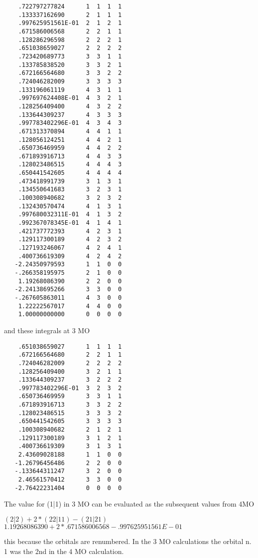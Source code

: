 \documentclass[a4paper,11pt]{report}
\begin{document}
\begin{verbatim}
    .722797277824      1  1  1  1
    .133337162690      2  1  1  1
    .997625951561E-01  2  1  2  1
    .671586006568      2  2  1  1
    .128286296598      2  2  2  1
    .651038659027      2  2  2  2
    .723420689773      3  3  1  1
    .133785838520      3  3  2  1
    .672166564680      3  3  2  2
    .724046282009      3  3  3  3
    .133196061119      4  3  1  1
    .997697624408E-01  4  3  2  1
    .128256409400      4  3  2  2
    .133644309237      4  3  3  3
    .997783402296E-01  4  3  4  3
    .671313370894      4  4  1  1
    .128056124251      4  4  2  1
    .650736469959      4  4  2  2
    .671893916713      4  4  3  3
    .128023486515      4  4  4  3
    .650441542605      4  4  4  4
    .473418991739      3  1  3  1
    .134550641683      3  2  3  1
    .100308940682      3  2  3  2
    .132430570474      4  1  3  1
    .997680032311E-01  4  1  3  2
    .992367078345E-01  4  1  4  1
    .421737772393      4  2  3  1
    .129117300189      4  2  3  2
    .127193246067      4  2  4  1
    .400736619309      4  2  4  2
   -2.24350979593      1  1  0  0
   -.266358195975      2  1  0  0
    1.19268086390      2  2  0  0
   -2.24138695266      3  3  0  0
   -.267605863011      4  3  0  0
    1.22222567017      4  4  0  0
    1.00000000000      0  0  0  0
\end{verbatim}

and these integrals at 3 MO

\begin{verbatim}
    .651038659027      1  1  1  1
    .672166564680      2  2  1  1
    .724046282009      2  2  2  2
    .128256409400      3  2  1  1
    .133644309237      3  2  2  2
    .997783402296E-01  3  2  3  2
    .650736469959      3  3  1  1
    .671893916713      3  3  2  2
    .128023486515      3  3  3  2
    .650441542605      3  3  3  3
    .100308940682      2  1  2  1
    .129117300189      3  1  2  1
    .400736619309      3  1  3  1
    2.43609028188      1  1  0  0
   -1.26796456486      2  2  0  0
   -.133644311247      3  2  0  0
    2.46561570412      3  3  0  0
   -2.76422231404      0  0  0  0
\end{verbatim}

The value for (1|1) in 3 MO can be evaluated as the
subsequent values from 4MO

$
(2|2)+2*(22|11) - (21|21)
$
$
1.19268086390+2*.671586006568-.997625951561E-01
$

this because the orbitals are renumbered. In the 3 MO calculations the
orbital n. 1 was the 2nd in the 4 MO calculation.
\end{document}
